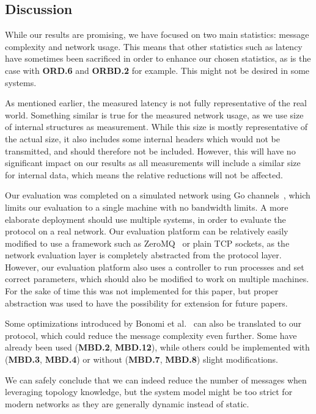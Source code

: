 \subsection{Discussion}

While our results are promising, we have focused on two main statistics: message complexity and network usage. This means that other statistics such as latency have sometimes been sacrificed in order to enhance our chosen statistics, as is the case with \textbf{ORD.6} and \textbf{ORBD.2} for example. This might not be desired in some systems.

As mentioned earlier, the measured latency is not fully representative of the real world. Something similar is true for the measured network usage, as we use size of internal structures as measurement. While this size is mostly representative of the actual size, it also includes some internal headers which would not be transmitted, and should therefore not be included. However, this will have no significant impact on our results as all measurements will include a similar size for internal data, which means the relative reductions will not be affected.

Our evaluation was completed on a simulated network using Go channels~\cite{channels}, which limits our evaluation to a single machine with no bandwidth limits. A more elaborate deployment should use multiple systems, in order to evaluate the protocol on a real network. Our evaluation platform can be relatively easily modified to use a framework such as ZeroMQ~\cite{zeromq} or plain TCP sockets, as the network evaluation layer is completely abstracted from the protocol layer. However, our evaluation platform also uses a controller to run processes and set correct parameters, which should also be modified to work on multiple machines. For the sake of time this was not implemented for this paper, but proper abstraction was used to have the possibility for extension for future papers.

Some optimizations introduced by Bonomi et al.~\cite{bonomi2021practical} can also be translated to our protocol, which could reduce the message complexity even further. Some have already been used (\textbf{MBD.2}, \textbf{MBD.12}), while others could be implemented with (\textbf{MBD.3}, \textbf{MBD.4}) or without (\textbf{MBD.7}, \textbf{MBD.8}) slight modifications.

We can safely conclude that we can indeed reduce the number of messages when leveraging topology knowledge, but the system model might be too strict for modern networks as they are generally dynamic instead of static. 